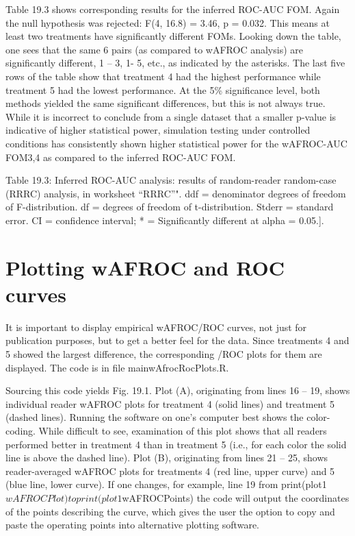 \documentclass[
]{book}
\begin{document}
Table 19.3 shows corresponding results for the inferred ROC-AUC FOM. Again the null hypothesis was rejected: F(4, 16.8) = 3.46, p = 0.032. This means at least two treatments have significantly different FOMs. Looking down the table, one sees that the same 6 pairs (as compared to wAFROC analysis) are significantly different, 1 -- 3, 1- 5, etc., as indicated by the asterisks. The last five rows of the table show that treatment 4 had the highest performance while treatment 5 had the lowest performance. At the 5\% significance level, both methods yielded the same significant differences, but this is not always true. While it is incorrect to conclude from a single dataset that a smaller p-value is indicative of higher statistical power, simulation testing under controlled conditions has consistently shown higher statistical power for the wAFROC-AUC FOM3,4 as compared to the inferred ROC-AUC FOM.

Table 19.3: Inferred ROC-AUC analysis: results of random-reader random-case (RRRC) analysis, in worksheet ``RRRC''". ddf = denominator degrees of freedom of F-distribution. df = degrees of freedom of t-distribution. Stderr = standard error. CI = confidence interval; * = Significantly different at alpha = 0.05.{]}.

\hypertarget{analyzing-froc-data-plotting}{%
\section{Plotting wAFROC and ROC curves}\label{analyzing-froc-data-plotting}}

It is important to display empirical wAFROC/ROC curves, not just for publication purposes, but to get a better feel for the data. Since treatments 4 and 5 showed the largest difference, the corresponding /ROC plots for them are displayed. The code is in file mainwAfrocRocPlots.R.

Sourcing this code yields Fig. 19.1. Plot (A), originating from lines 16 -- 19, shows individual reader wAFROC plots for treatment 4 (solid lines) and treatment 5 (dashed lines). Running the software on one's computer best shows the color-coding. While difficult to see, examination of this plot shows that all readers performed better in treatment 4 than in treatment 5 (i.e., for each color the solid line is above the dashed line). Plot (B), originating from lines 21 -- 25, shows reader-averaged wAFROC plots for treatments 4 (red line, upper curve) and 5 (blue line, lower curve). If one changes, for example, line 19 from print(plot1\(wAFROCPlot) to print(plot1\)wAFROCPoints) the code will output the coordinates of the points describing the curve, which gives the user the option to copy and paste the operating points into alternative plotting software.
\end{document}
